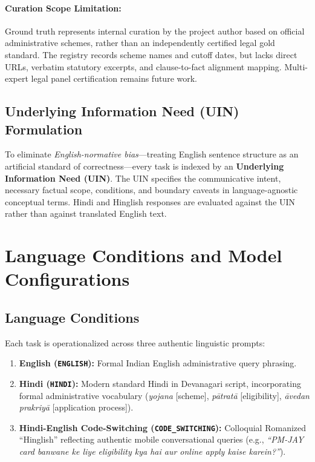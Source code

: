 \documentclass[11pt,a4paper]{article}
\begin{document}
\paragraph{Curation Scope Limitation:} Ground truth represents internal curation by the project author based on official administrative schemes, rather than an independently certified legal gold standard. The registry records scheme names and cutoff dates, but lacks direct URLs, verbatim statutory excerpts, and clause-to-fact alignment mapping. Multi-expert legal panel certification remains future work.

\subsection{Underlying Information Need (UIN) Formulation}
\label{sec:uin}

To eliminate \emph{English-normative bias}---treating English sentence structure as an artificial standard of correctness---every task is indexed by an \textbf{Underlying Information Need (UIN)}. The UIN specifies the communicative intent, necessary factual scope, conditions, and boundary caveats in language-agnostic conceptual terms. Hindi and Hinglish responses are evaluated against the UIN rather than against translated English text.

\section{Language Conditions and Model Configurations}
\label{sec:language_conditions}

\subsection{Language Conditions}
\label{sec:languages}

Each task is operationalized across three authentic linguistic prompts:
\begin{enumerate}
  \item \textbf{English (\texttt{ENGLISH}):} Formal Indian English administrative query phrasing.
  \item \textbf{Hindi (\texttt{HINDI}):} Modern standard Hindi in Devanagari script, incorporating formal administrative vocabulary (\textit{yojana} [scheme], \textit{p\=atrat\=a} [eligibility], \textit{\=avedan prakriy\=a} [application process]).
  \item \textbf{Hindi-English Code-Switching (\texttt{CODE\_SWITCHING}):} Colloquial Romanized ``Hinglish'' reflecting authentic mobile conversational queries (e.g., \emph{``PM-JAY card banwane ke liye eligibility kya hai aur online apply kaise karein?''}).
\end{enumerate}
\end{document}
